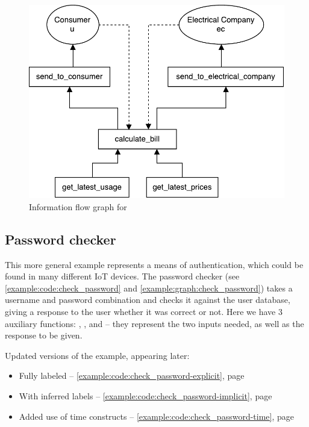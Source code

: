 
\begin{figure}
  \centering
  \includegraphics[scale=0.8]{figures/dlm_calculate_bill}
  \caption{Information flow graph for }
  \label{example:graph:calculate_bill}
\end{figure}

\subsection{Password checker}\label{example:sec:check_password}
This more general example represents a means of authentication, which could be found in many different IoT devices.
The password checker (see \cref{example:code:check_password} and \cref{example:graph:check_password}) takes a username and password combination and checks it against the user database, giving a response to the user whether it was correct or not.
Here we have 3 auxiliary functions: , , and  -- they represent the two inputs needed, as well as the response to be given.

Updated versions of the example, appearing later:
\begin{itemize}
  \item Fully labeled -- \cref{example:code:check_password-explicit}, page \pageref{example:code:check_password-explicit}
  \item With inferred labels -- \cref{example:code:check_password-implicit}, page \pageref{example:code:check_password-implicit}
  \item Added use of time constructs -- \cref{example:code:check_password-time}, page \pageref{example:code:check_password-time}
\end{itemize}

